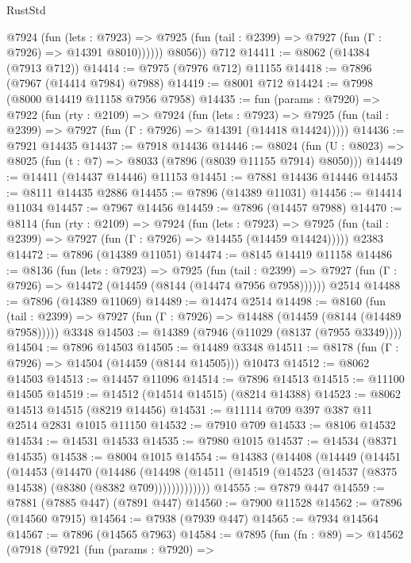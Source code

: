 \begin{lexlean}{RustStd}
\begin{coremodule}
{\begin{coremodule}
{{{{{{{{{{{{{{{{{{{{{{{{{{{{{{{{{{{{{{{{{{{{{{{{{{            @7924
              (fun (lets : @7923) =>
              @7925 (fun (tail : @2399) => @7927 (fun (Γ : @7926) => @14391 @8010))))))
        @8056))
    @712
@14411 := @8062 (@14384 (@7913 @712))
@14414 := @7975 (@7976 @712) @11155
@14418 := @7896 (@7967 (@14414 @7984) @7988)
@14419 := @8001 @712
@14424 := @7998 (@8000 @14419 @11158 @7956 @7958)
@14435 := fun (params : @7920) =>
  @7922
    (fun (rty : @2109) =>
    @7924
      (fun (lets : @7923) =>
      @7925 (fun (tail : @2399) => @7927 (fun (Γ : @7926) => @14391 (@14418 @14424)))))
@14436 := @7921 @14435
@14437 := @7918 @14436
@14446 := @8024
    (fun (U : @8023) => @8025 (fun (t : @7) => @8033 (@7896 (@8039 @11155 @7914) @8050)))
@14449 := @14411 (@14437 @14446) @11153
@14451 := @7881 @14436 @14446
@14453 := @8111 @14435 @2886
@14455 := @7896 (@14389 @11031)
@14456 := @14414 @11034
@14457 := @7967 @14456
@14459 := @7896 (@14457 @7988)
@14470 := @8114
    (fun (rty : @2109) =>
    @7924
      (fun (lets : @7923) =>
      @7925 (fun (tail : @2399) => @7927 (fun (Γ : @7926) => @14455 (@14459 @14424)))))
    @2383
@14472 := @7896 (@14389 @11051)
@14474 := @8145 @14419 @11158
@14486 := @8136
    (fun (lets : @7923) =>
    @7925
      (fun (tail : @2399) =>
      @7927 (fun (Γ : @7926) => @14472 (@14459 (@8144 (@14474 @7956 @7958))))))
    @2514
@14488 := @7896 (@14389 @11069)
@14489 := @14474 @2514
@14498 := @8160
    (fun (tail : @2399) => @7927 (fun (Γ : @7926) => @14488 (@14459 (@8144 (@14489 @7958)))))
    @3348
@14503 := @14389 (@7946 (@11029 (@8137 (@7955 @3349))))
@14504 := @7896 @14503
@14505 := @14489 @3348
@14511 := @8178 (fun (Γ : @7926) => @14504 (@14459 (@8144 @14505))) @10473
@14512 := @8062 @14503
@14513 := @14457 @11096
@14514 := @7896 @14513
@14515 := @11100 @14505
@14519 := @14512 (@14514 @14515) (@8214 @14388)
@14523 := @8062 @14513 @14515 (@8219 @14456)
@14531 := @11114 @709 @397 @387 @11 @2514 @2831 @1015 @11150
@14532 := @7910 @709
@14533 := @8106 @14532
@14534 := @14531 @14533
@14535 := @7980 @1015
@14537 := @14534 (@8371 @14535)
@14538 := @8004 @1015
@14554 := @14383
    (@14408
      (@14449
        (@14451
          (@14453
            (@14470
              (@14486
                (@14498
                  (@14511 (@14519 (@14523 (@14537 (@8375 @14538) (@8380 (@8382 @709)))))))))))))
@14555 := @7879 @447
@14559 := @7881 (@7885 @447) (@7891 @447)
@14560 := @7900 @11528
@14562 := @7896 (@14560 @7915)
@14564 := @7938 (@7939 @447)
@14565 := @7934 @14564
@14567 := @7896 (@14565 @7963)
@14584 := @7895
    (fun (fn : @89) =>
    @14562
      (@7918
        (@7921
          (fun (params : @7920) =>
}}}}}}}}}}}}}}}}}}}}}}}}}}}}}}}}}}}}}}}}}}}}}}}}}}
\end{coremodule}}
\end{coremodule}
\end{lexlean}
